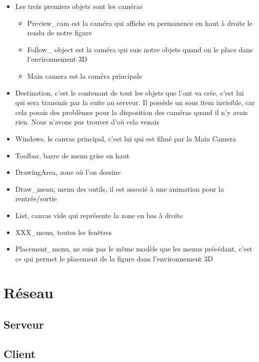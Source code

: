 \documentclass[a4paper,11pt]{article}
\begin{document}
		\begin{itemize}
			\item Les trois premiers objets sont les caméras
				\begin{itemize}
					\item Preview\_cam est la caméra qui affiche en permanence en haut à droite le rendu de notre figure
					\item Follow\_ object est la caméra qui suis notre objets quand on le place dans l'environnement 3D
					\item Main camera est la caméra principale
				\end{itemize}
			\item Destination, c'est le contenant de tout les objets que l'ont va crée, c'est lui qui sera transmis par la suite au serveur. Il possède un sous item invisible, car cela posais des problèmes pour la disposition des caméras quand il n'y avais rien. Nous n'avons pas trouver d'où cela venais
			\item Windows, le canvas principal, c'est lui qui est filmé par la Main Camera
			\item Toolbar, barre de menu grise en haut
			\item DrawingArea, zone où l'on dessine
			\item Draw\_menu, menu des outils, il est associé à une animation pour la rentrée/sortie
			\item List, canvas vide qui représente la zone en bas à droite
			\item XXX\_menu, toutes les fenêtres
			\item Placement\_menu, ne suis pas le même modèle que les menus précédant, c'est ce qui permet le placement de la figure dans l'environnement 3D
		\end{itemize}
		
\section{Réseau}
	\subsection{Serveur}
		
	\subsection{Client}
\end{document}
